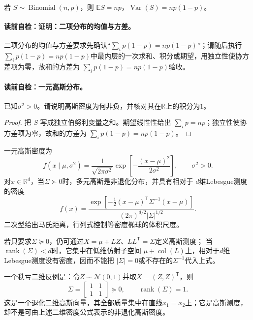 \label{struct:V1-C05-CH12}
\begin{theorem}[二项分布的均值与方差]
若 $S\sim\operatorname{Binomial}(n,p)$，则 $\mathbb ES=np$，$\operatorname{Var}(S)=np(1-p)$。
\end{theorem}
\label{struct:V1-C05-CH15}
\paragraph{读前自检：证明：二项分布的均值与方差。}二项分布的均值与方差要求先确认“$\sum_i p(1-p)=np(1-p)$”；请随后执行$\sum_i p(1-p)=np(1-p)$中最内层的一次求和、积分或期望，用独立性使协方差项为零，故和的方差为 $\sum_i p(1-p)=np(1-p)$验收。\par
\paragraph{读前自检：一元高斯分布。}已知$\sigma^2>0$。请说明高斯密度为何非负，并核对其在$\mathbb R$上的积分为$1$。\par

\begin{proof}
把 $S$ 写成独立伯努利变量之和。期望线性性给出 $\sum_i p=np$；独立性使协方差项为零，故和的方差为 $\sum_i p(1-p)=np(1-p)$。
\end{proof}
一元高斯密度为
\[
f(x\mid\mu,\sigma^2)=\frac{1}{\sqrt{2\pi\sigma^2}}
\exp\!\left[-\frac{(x-\mu)^2}{2\sigma^2}\right],\qquad \sigma^2>0.
\]
对$x\in\mathbb R^d$，当$\Sigma\succ0$时，多元高斯是非退化分布，并具有相对于
$d$维Lebesgue测度的密度
\[
f(x)=\frac{\exp[-\tfrac12(x-\mu)^{\mathsf T}\Sigma^{-1}(x-\mu)]}
{(2\pi)^{d/2}|\Sigma|^{1/2}}.
\]
二次型给出马氏距离，行列式控制等密度椭球的体积尺度。

\begin{keypointbox}[title=扩展讨论：非退化密度与退化高斯测度]
若只要求$\Sigma\succeq0$，仍可通过$X=\mu+LZ$、$LL^{\mathsf T}=\Sigma$定义高斯测度；
当$\operatorname{rank}(\Sigma)<d$时，它集中在低维仿射子空间
$\mu+\operatorname{col}(L)$上，相对于$d$维Lebesgue测度没有密度，因而不能把
$|\Sigma|=0$或不存在的$\Sigma^{-1}$代入上式。

一个秩亏二维反例是：令$Z\sim\mathcal N(0,1)$并取$X=(Z,Z)^{\mathsf T}$，则
\[
\Sigma=\begin{bmatrix}1&1\\1&1\end{bmatrix}\succeq0,
\qquad \operatorname{rank}(\Sigma)=1.
\]
这是一个退化二维高斯向量，其全部质量集中在直线$x_1=x_2$上；它是高斯测度，
却不是可由上述二维密度公式表示的非退化高斯密度。
\end{keypointbox}

